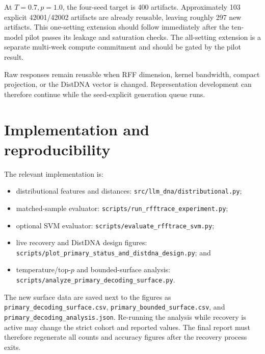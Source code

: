 \documentclass[11pt,a4paper]{article}
\begin{document}
At $T=0.7,p=1.0$, the four-seed target is 400 artifacts. Approximately 103
explicit 42001/42002 artifacts are already reusable, leaving roughly 297 new
artifacts. This one-setting extension should follow immediately after the
ten-model pilot passes its leakage and saturation checks. The all-setting
extension is a separate multi-week compute commitment and should be gated by
the pilot result.

Raw responses remain reusable when RFF dimension, kernel bandwidth, compact
projection, or the DistDNA vector is changed. Representation development can
therefore continue while the seed-explicit generation queue runs.

\section{Implementation and reproducibility}

The relevant implementation is:

\begin{itemize}
  \item distributional features and distances:
        \nolinkurl{src/llm_dna/distributional.py};
  \item matched-sample evaluator:
        \nolinkurl{scripts/run_rfftrace_experiment.py};
  \item optional SVM evaluator:
        \nolinkurl{scripts/evaluate_rfftrace_svm.py};
  \item live recovery and DistDNA design figures:
        \nolinkurl{scripts/plot_primary_status_and_distdna_design.py}; and
  \item temperature/top-$p$ and bounded-surface analysis:
        \nolinkurl{scripts/analyze_primary_decoding_surface.py}.
\end{itemize}

The new surface data are saved next to the figures as
\nolinkurl{primary_decoding_surface.csv},
\nolinkurl{primary_bounded_surface.csv}, and
\nolinkurl{primary_decoding_analysis.json}. Re-running the analysis while
recovery is active may change the strict cohort and reported values. The final
report must therefore regenerate all counts and accuracy figures after the
recovery process exits.
\end{document}
